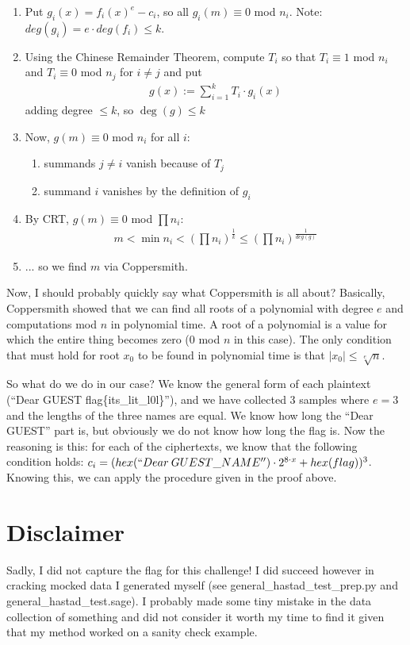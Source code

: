 \documentclass{article}
\begin{document}
\begin{enumerate}
    \item Put $g_i(x)=f_i(x)^{e}-c_i$, so all $g_i(m) \equiv 0$ mod $n_i$. Note: $deg(g_i)=e \cdot deg(f_i) \leq k$.
    \item Using the Chinese Remainder Theorem, compute $T_i$ so that $T_i \equiv 1$ mod $n_i$ and $T_i \equiv 0$ mod $n_j$ for $i \neq j$ and put
        \begin{align*}
            g(x) := \sum_{i=1}^{k} T_i \cdot g_i(x)
        \end{align*} 
        adding degree $\leq k$, so $\deg(g) \leq k$
    \item Now, $g(m) \equiv 0$ mod $n_i$ for all $i$:
        \begin{enumerate}
            \item summands $j \neq i$ vanish because of $T_j$
            \item summand $i$ vanishes by the definition of $g_i$
        \end{enumerate}
    \item By CRT, $g(m) \equiv 0$ mod $\prod n_i$: 
        \begin{align*}
            m < \min n_i < (\prod n_i)^{\frac{1}{k}} \leq (\prod n_i)^{\frac{1}{deg(g)}}
        \end{align*}
    \item ... so we find $m$ via Coppersmith.  
\end{enumerate}

Now, I should probably quickly say what Coppersmith is all about? Basically, Coppersmith showed that we can find all roots of a polynomial with degree $e$ and computations mod $n$ in polynomial time. A root of a polynomial is a value for which the entire thing becomes zero (0 mod $n$ in this case). The only condition that must hold for root $x_0$ to be found in polynomial time is that $|x_0| \leq \sqrt[e]{n}$. \medskip

So what do we do in our case? We know the general form of each plaintext (``Dear GUEST flag\{its\_lit\_l0l\}''), and we have collected 3 samples where $e=3$ and the lengths of the three names are equal. We know how long the ``Dear GUEST'' part is, but obviously we do not know how long the flag is. Now the reasoning is this: for each of the ciphertexts, we know that the following condition holds: $c_i = (hex(``Dear \medspace GUEST\_NAME'') \cdot 2^{8 \cdot x} + hex(flag))^3$. Knowing this, we can apply the procedure given in the proof above.

\section{Disclaimer}

Sadly, I did not capture the flag for this challenge! I did succeed however in cracking mocked data I generated myself (see general\_hastad\_test\_prep.py and general\_hastad\_test.sage). I probably made some tiny mistake in the data collection of something and did not consider it worth my time to find it given that my method worked on a sanity check example.
\end{document}

